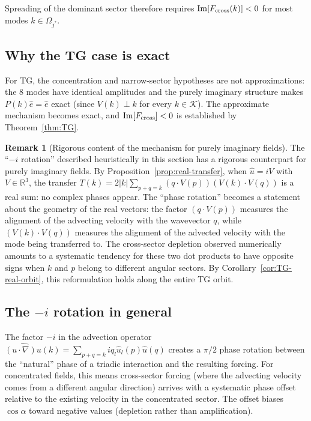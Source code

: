 \documentclass[11pt]{article}
\theoremstyle{definition}
\newtheorem{remark}[theorem]{Remark}
\newcommand{\R}{\mathbb{R}}
\newcommand{\cK}{\mathcal{K}}
\DeclareMathOperator{\im}{Im}
\begin{document}
Spreading of the dominant sector therefore requires
$\im[F_{\rm cross}(k)] < 0$ for most modes
$k\in\Omega_{j^*}$.

\subsection{Why the TG case is exact}

For TG, the concentration and narrow-sector hypotheses
are not approximations: the 8 modes have identical
amplitudes and the purely imaginary structure makes
$P(k)\hat e = \hat e$ exact (since $V(k)\perp k$
for every $k\in\cK$).  The approximate mechanism becomes
exact, and $\im[F_{\rm cross}]<0$ is established by
Theorem~\ref{thm:TG}.

\begin{remark}[Rigorous content of the mechanism
for purely imaginary fields]
\label{rem:mechanism-rigorous}
The ``$-i$ rotation'' described heuristically in
this section has a rigorous counterpart for
purely imaginary fields.  By
Proposition~\ref{prop:real-transfer}, when
$\hat u = iV$ with $V\in\R^3$, the transfer
$T(k) = 2|k|\sum_{p+q=k}(q\cdot V(p))(V(k)\cdot V(q))$
is a real sum: no complex phases appear.  The
``phase rotation'' becomes a statement about the
geometry of the real vectors: the
factor $(q\cdot V(p))$ measures the alignment of
the advecting velocity with the wavevector $q$,
while $(V(k)\cdot V(q))$ measures the alignment
of the advected velocity with the mode being
transferred to.  The cross-sector depletion
observed numerically amounts to a systematic
tendency for these two dot products to have
opposite signs when $k$ and $p$ belong to
different angular sectors.  By
Corollary~\ref{cor:TG-real-orbit}, this
reformulation holds along the entire TG orbit.
\end{remark}

\subsection{The $-i$ rotation in general}

The factor $-i$ in the advection operator
$\widehat{(u\cdot\nabla)u}(k) = \sum_{p+q=k}
iq_l\hat u_l(p)\hat u(q)$ creates a $\pi/2$ phase
rotation between the ``natural'' phase of a triadic
interaction and the resulting forcing.  For concentrated
fields, this means cross-sector forcing (where the
advecting velocity comes from a different angular
direction) arrives with a systematic phase offset
relative to the existing velocity in the concentrated
sector.  The offset biases $\cos\alpha$ toward negative
values (depletion rather than amplification).
\end{document}
